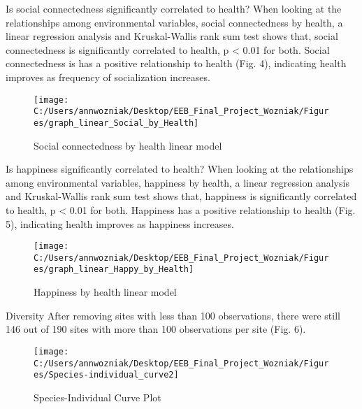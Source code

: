 Is social connectedness significantly correlated to health? When looking
at the relationships among environmental variables, social connectedness
by health, a linear regression analysis and Kruskal-Wallis rank sum test
shows that, social connectedness is significantly correlated to health,
p \textless{} 0.01 for both. Social connectedness is has a positive
relationship to health (Fig. 4), indicating health improves as frequency
of socialization increases.

\begin{Schunk}
\begin{figure}
\texttt{[image: C:/Users/annwozniak/Desktop/EEB\_Final\_Project\_Wozniak/Figures/graph\_linear\_Social\_by\_Health]} \caption[Social connectedness by health linear model]{Social connectedness by health linear model}\label{fig:fig.4}
\end{figure}
\end{Schunk}

Is happiness significantly correlated to health? When looking at the
relationships among environmental variables, happiness by health, a
linear regression analysis and Kruskal-Wallis rank sum test shows that,
happiness is significantly correlated to health, p \textless{} 0.01 for
both. Happiness has a positive relationship to health (Fig. 5),
indicating health improves as happiness increases.

\begin{Schunk}
\begin{figure}
\texttt{[image: C:/Users/annwozniak/Desktop/EEB\_Final\_Project\_Wozniak/Figures/graph\_linear\_Happy\_by\_Health]} \caption[Happiness by health linear model ]{Happiness by health linear model }\label{fig:fig.5}
\end{figure}
\end{Schunk}

Diversity After removing sites with less than 100 observations, there
were still 146 out of 190 sites with more than 100 observations per site
(Fig. 6).

\begin{Schunk}
\begin{figure}
\texttt{[image: C:/Users/annwozniak/Desktop/EEB\_Final\_Project\_Wozniak/Figures/Species-individual\_curve2]} \caption[Species-Individual Curve Plot]{Species-Individual Curve Plot}\label{fig:fig.6}
\end{figure}
\end{Schunk}

